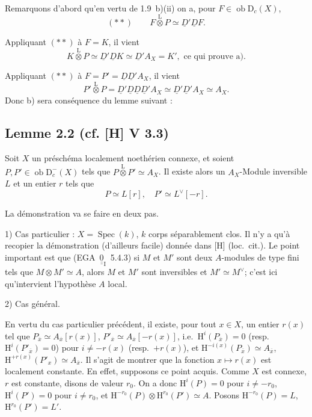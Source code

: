 \documentclass[11pt]{article}
\renewcommand{\H}{\mathrm{H}}
\DeclareMathOperator{\Spec}{Spec}
\newcommand{\D}{\mathrm{D}}
\newcommand{\ob}{\operatorname{ob}}
\newcommand{\ol}[1]{\overline{#1}}
\providecommand{\ob}{\operatorname{ob}}
\providecommand{\Spec}{\operatorname{Spec}}
\providecommand{\Spec}{\operatorname{Spec}}
\providecommand{\Spec}{\operatorname{Spec}}
\providecommand{\Spec}{\operatorname{Spec}}
\begin{document}
Remarquons d'abord qu'en vertu de 1.9~b)(ii) on a, pour $F \in \ob \D_c(X)$,
\[
(**) \qquad F \mathop{\otimes}\limits^{\mathrm{L}} P \simeq \underline{D}'\underline{D} F.
\]

Appliquant $(**)$ à $F = K$, il vient
\[
K \mathop{\otimes}\limits^{\mathrm{L}} P \simeq \underline{D}'\underline{D} K \simeq \underline{D}' A_X = K', \text{ ce qui prouve a).}
\]

Appliquant $(**)$ à $F = P' = \underline{D}\underline{D}'A_X$, il vient
\[
P' \mathop{\otimes}\limits^{\mathrm{L}} P = \underline{D}'\underline{D}\underline{D}\underline{D}'A_X \simeq \underline{D}'\underline{D}'A_X \simeq A_X.
\]
Donc b) sera conséquence du lemme suivant :

\subsection*{Lemme 2.2 (cf. [H] V 3.3)}
Soit $X$ un préschéma localement noethérien connexe, et soient $P, P' \in \ob \D_c^{-}(X)$ tels que $P \mathop{\otimes}\limits^{\mathrm{L}} P' \simeq A_X$. Il existe alors un $A_X$-Module inversible $L$ et un entier $r$ tels que
\[
P \simeq L[r], \quad P' \simeq L^{\vee}[-r].
\]

La démonstration va se faire en deux pas.

1) Cas particulier : $X = \Spec(k)$, $k$ corps séparablement clos. Il n'y a qu'à recopier la démonstration (d'ailleurs facile) donnée dans [H] (loc.~cit.). Le point important est que (EGA~$\underline{\underline{0}}_{\mathrm{I}}$~5.4.3) si $M$ et $M'$ sont deux $A$-modules de type fini tels que $M \otimes M' \simeq A$, alors $M$ et $M'$ sont inversibles et $M' \simeq M^{\vee}$; c'est ici qu'intervient l'hypothèse $A$ local.

2) Cas général.

En vertu du cas particulier précédent, il existe, pour tout $x \in X$, un entier $r(x)$ tel que $P_{\ol{x}} \simeq A_{\ol{x}}[r(x)]$, $P'_{\ol{x}} \simeq A_{\ol{x}}[-r(x)]$, i.e.~$\H^i(P_{\ol{x}}) = 0$ (resp.~$\H^i(P'_{\ol{x}}) = 0$) pour $i \neq -r(x)$ (resp.~$+r(x)$), et $\H^{-i(x)}(P_{\ol{x}}) \simeq A_{\ol{x}}$, $\H^{+r(x)}(P'_{x}) \simeq A_{\ol{x}}$. Il s'agit de montrer que la fonction $x \mapsto r(x)$ est localement constante. En effet, supposons ce
point acquis. Comme $X$ est connexe, $r$ est constante, disons de valeur $r_0$. On a donc $\H^i(P) = 0$ pour $i \neq -r_0$, $\H^i(P') = 0$ pour $i \neq r_0$, et $\H^{-r_0}(P) \otimes \H^{r_0}(P') \simeq A$. Posons $\H^{-r_0}(P) = L$, $\H^{r_0}(P') = L'$.
\end{document}
